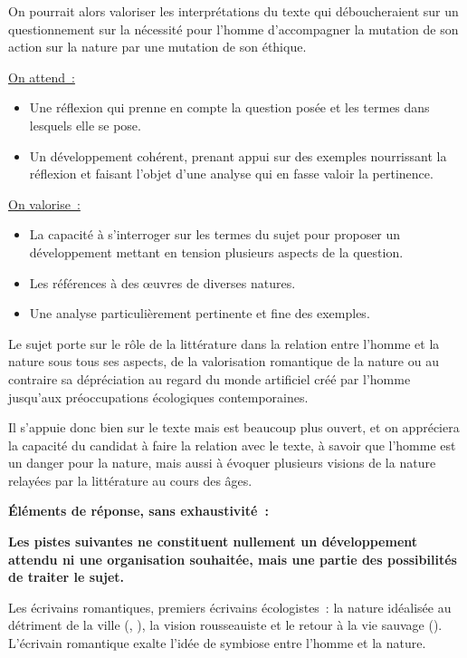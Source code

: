 {On pourrait alors valoriser les interprétations du texte qui déboucheraient sur un
questionnement sur la nécessité pour l'homme d'accompagner la mutation de son action sur la
nature par une mutation de son éthique.}%
{\underline{On attend~:}
\begin{itemize}
\item Une réflexion qui prenne en compte la question posée et les termes dans lesquels elle
se pose.
\item Un développement cohérent, prenant appui sur des exemples nourrissant la réflexion
et faisant l'objet d'une analyse qui en fasse valoir la pertinence.
\end{itemize}

\underline{On valorise~:}
\begin{itemize}
\item La capacité à s'interroger sur les termes du sujet pour proposer un développement
mettant en tension plusieurs aspects de la question.
\item Les références à des œuvres de diverses natures.
\item Une analyse particulièrement pertinente et fine des exemples.
\end{itemize}

Le sujet porte sur le rôle de la littérature dans la relation entre l'homme et la nature sous tous
ses aspects, de la valorisation romantique de la nature ou au contraire sa dépréciation au
regard du monde artificiel créé par l'homme jusqu'aux préoccupations écologiques
contemporaines.

Il s'appuie donc bien sur le texte mais est beaucoup plus ouvert, et on appréciera la capacité
du candidat à faire la relation avec le texte, à savoir que l'homme est un danger pour la nature,
mais aussi à évoquer plusieurs visions de la nature relayées par la littérature au cours des
âges.

\bigskip

\textbf{Éléments de réponse, sans exhaustivité~:}

\textbf{Les pistes suivantes ne constituent nullement un développement attendu ni une
organisation souhaitée, mais une partie des possibilités de traiter le sujet.}

Les écrivains romantiques, premiers écrivains écologistes~: la nature idéalisée au détriment
de la ville (, ), la vision rousseauiste et le retour à la vie sauvage (). L'écrivain romantique exalte l'idée de symbiose entre
l'homme et la nature.

}
